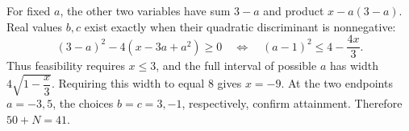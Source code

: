 For fixed $a$, the other two variables have sum $3-a$ and product $x-a(3-a)$. Real values $b,c$ exist exactly when their quadratic discriminant is nonnegative:
\[
(3-a)^2-4(x-3a+a^2)\ge0
\quad\Longleftrightarrow\quad
(a-1)^2\le4-\dfrac{4x}{3}.
\]
Thus feasibility requires $x\le3$, and the full interval of possible $a$ has width $4\sqrt{1-\dfrac{x}{3}}$. Requiring this width to equal $8$ gives $x=-9$. At the two endpoints $a=-3,5$, the choices $b=c=3,-1$, respectively, confirm attainment. Therefore $\boxed{50+N=41}$.
